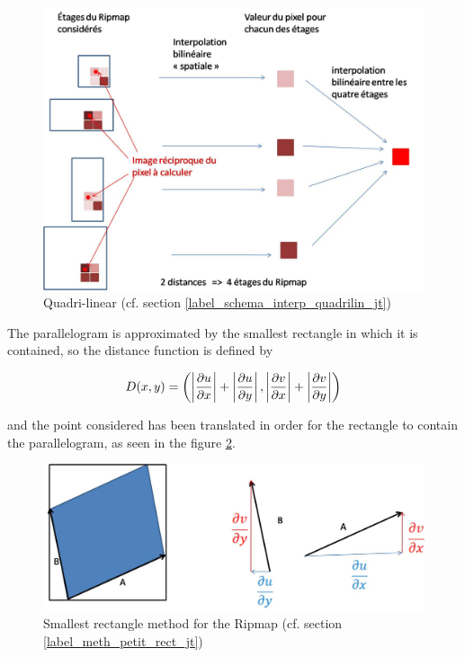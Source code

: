\label{label_schema_interp_quadrilin_jt}
\begin{figure}[h!]
\centering
\includegraphics[scale=0.5]{interbibilineaire.jpg}
\caption{Quadri-linear (cf. section \ref{label_schema_interp_quadrilin_jt})}
\label{interbibilineaire}
\end{figure}

The parallelogram is approximated by the smallest rectangle in which it is contained, so the distance function is defined by

$$D(x,y) = \left( \left|\frac{\partial u}{\partial x}\right|+\left|\frac{\partial u}{\partial y}\right|,\left|\frac{\partial v}{\partial x}\right|+\left|\frac{\partial v}{\partial y}\right|\right)$$

and the point considered has been translated in order for the rectangle to contain the parallelogram, as seen in the figure  \ref{methode_distance_ripmap}.


\label{label_meth_petit_rect_jt}
\begin{figure}[h!]
\centering
\includegraphics[scale=0.5]{methode_distance_ripmap.jpg}
\caption{Smallest rectangle method for the Ripmap (cf. section \ref{label_meth_petit_rect_jt})}
\label{methode_distance_ripmap}
\end{figure}

